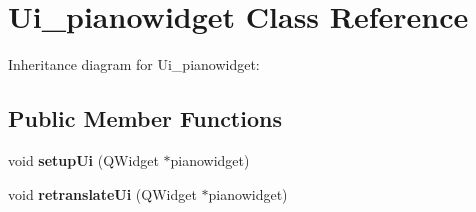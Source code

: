 \hypertarget{classUi__pianowidget}{}\section{Ui\+\_\+pianowidget Class Reference}
\label{classUi__pianowidget}


Inheritance diagram for Ui\+\_\+pianowidget\+:
\subsection*{Public Member Functions}
\begin{DoxyCompactItemize}
\item 
\mbox{\label{classUi__pianowidget_ab70bb1f73af329bc8bf72403395c174b}} 
void {\bfseries setup\+Ui} (Q\+Widget $\ast$pianowidget)
\item 
\mbox{\label{classUi__pianowidget_a4f18dceba31e5c49d569128941a28840}} 
void {\bfseries retranslate\+Ui} (Q\+Widget $\ast$pianowidget)
\end{DoxyCompactItemize}
